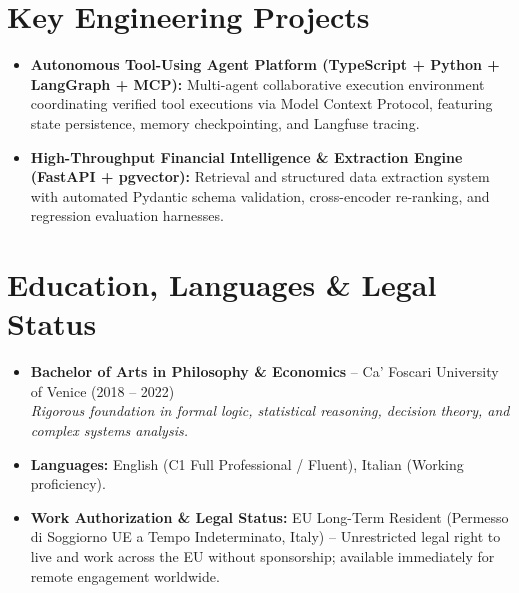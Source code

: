 \documentclass[a4paper,10pt]{article}
\begin{document}
\section{Key Engineering Projects}
\begin{itemize}
  \item \textbf{Autonomous Tool-Using Agent Platform (TypeScript + Python + LangGraph + MCP):} Multi-agent collaborative execution environment coordinating verified tool executions via Model Context Protocol, featuring state persistence, memory checkpointing, and Langfuse tracing.
  \item \textbf{High-Throughput Financial Intelligence \& Extraction Engine (FastAPI + pgvector):} Retrieval and structured data extraction system with automated Pydantic schema validation, cross-encoder re-ranking, and regression evaluation harnesses.
\end{itemize}

\section{Education, Languages \& Legal Status}
\begin{itemize}
  \item \textbf{Bachelor of Arts in Philosophy \& Economics} -- Ca' Foscari University of Venice (2018 -- 2022) \\
  \textit{Rigorous foundation in formal logic, statistical reasoning, decision theory, and complex systems analysis.}
  \item \textbf{Languages:} English (C1 Full Professional / Fluent), Italian (Working proficiency).
  \item \textbf{Work Authorization \& Legal Status:} EU Long-Term Resident (Permesso di Soggiorno UE a Tempo Indeterminato, Italy) -- Unrestricted legal right to live and work across the EU without sponsorship; available immediately for remote engagement worldwide.
\end{itemize}
\end{document}
